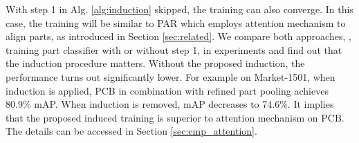 \documentclass[10pt,twocolumn,letterpaper]{article}
\begin{document}
With step 1 in Alg. \ref{alg:induction} skipped, the training can also converge. In this case, the training will be similar to PAR \cite{Zhao2017Deeply} which employs attention mechanism to align parts, as introduced in Section \ref{sec:related}. We compare both approaches, \ie, training part classifier with or without step 1, in experiments and find out that the induction procedure matters. Without the proposed induction, the performance turns out significantly lower. For example on Market-1501, when induction is applied, PCB in combination with refined part pooling achieves 80.9\% mAP. When induction is removed, mAP decreases to 74.6\%. It implies that the proposed induced training is superior to attention mechanism on PCB. The details can be accessed in Section \ref{sec:cmp_attention}. 

\setlength{\tabcolsep}{5.6pt}
\end{document}
